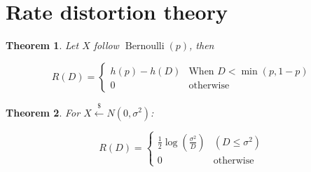 \documentclass{article}
\newcommand{\leftsample}{\overset{{\scriptscriptstyle\$}}{\leftarrow}}
\newtheorem{theorem}{Theorem}[section]
\begin{document}
\section{Rate distortion theory}
\begin{theorem}
    Let $X$ follow $\operatorname{Bernoulli}(p)$, then

    $$
    R(D) = \begin{cases}
        h(p) - h(D)  & \text{When $D < \min(p, 1-p)$} \\
        0   &  \text{otherwise}
    \end{cases}
$$
\end{theorem}

\begin{theorem}
    For $X \leftsample N(0, \sigma^2)$:

    $$
    R(D) = \begin{cases}
        \frac{1}{2}\log(\frac{\sigma^2}{D}) & (D \leq \sigma^2) \\
        0 & \text{otherwise}
    \end{cases}
    $$
\end{theorem}
\end{document}

